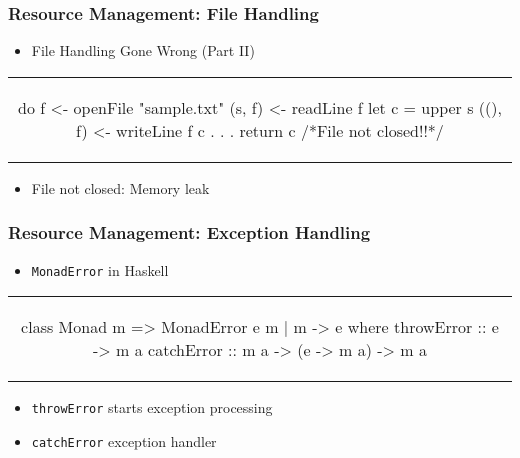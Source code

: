 \begin{frame}[fragile]
  \frametitle{Resource Management: File Handling}
  \begin{center}

  \begin{itemize}
  \item File Handling Gone Wrong (Part II)
  \end{itemize}
  \begin{tabular}[h]{c}
    \begin{haskell}
    do f  <- openFile "sample.txt"
       (s, f)  <- readLine f
       let c = upper s
       ((), f) <- writeLine f c
           .
           .
           .
       return c /*File not closed!!*/
     \end{haskell}
  \end{tabular}
  \begin{itemize}
  \item File not closed: Memory leak
  \end{itemize}
  \end{center}
\end{frame}

\begin{frame}[fragile]
  \frametitle{Resource Management: Exception Handling}
  \begin{center}

  \begin{itemize}
  \item \texttt{MonadError}\citep{liang_monad_1995} in Haskell
  \end{itemize}
  \begin{tabular}[h]{c}
    \begin{haskell}
class Monad m => MonadError e m | m -> e where
    throwError :: e -> m a
    catchError :: m a -> (e -> m a) -> m a
     \end{haskell}
  \end{tabular}
  \begin{itemize}
  \item \texttt{throwError} starts exception processing
  \item \texttt{catchError} exception handler
  \end{itemize}
  \end{center}
\end{frame}

